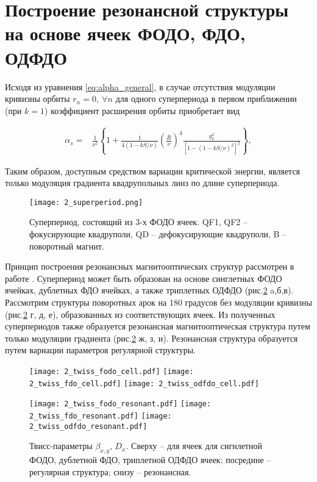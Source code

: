 	\section{Построение резонансной структуры на основе ячеек ФОДО, ФДО, ОДФДО}\label{sec:transition_variation/methods/FODO_FDO}

Исходя из уравнения \ref{eq:alpha_general}, в случае отсутствия модуляции кривизны орбиты $r_n=0, \ \forall n$ для одного суперпериода в первом приближении (при $k=1$) коэффициент расширения орбиты приобретает вид
	
\begin{equation}
\begin{aligned}
\alpha_s= & \frac{1}{\nu^2}\left\{1+\frac{1}{4(1-k S / \nu)}\left(\frac{\bar{R}}{\nu}\right)^4 \frac{g_k^2}{\left[1-(1-k S / \nu)^2\right]^2}\right\},
\end{aligned}
\label{eq:alpha_gradient}
\end{equation}

\noindent Таким образом, доступным средством вариации критической энергии, является только модуляция градиента квадрупольных линз по длине суперпериода.

\begin{figure} [h!]
   \texttt{[image: 2\_superperiod.png]}
   \caption{Суперпериод, состоящий из 3-х ФОДО ячеек. QF1, QF2 – фокусирующие квадруполи, QD –  дефокусирующие квадруполи, B – поворотный магнит.}
   \label{fig:superperiod_3FODO}
\end{figure}
	
\par Принцип построения резонансных магнитооптических структур рассмотрен в работе \cite{senichev:construction}.
Суперпериод может быть образован на основе синглетных ФОДО ячейках, дублетных ФДО ячейках, а также триплетных ОДФДО (рис.\ref{fig:fodo_fdo_odfdo} a,б,в). Рассмотрим структуры поворотных арок на 180 градусов без модуляции кривизны (рис.\ref{fig:fodo_fdo_odfdo} г, д, е), образованных из соответствующих ячеек. Из полученных суперпериодов также образуется резонансная магнитооптическая структура путем только модуляции градиента (рис.\ref{fig:fodo_fdo_odfdo} ж, з, и). Резонансная структура образуется путем вариации параметров регулярной структуры.

\begin{figure} [h!]

   \texttt{[image: 2\_twiss\_fodo\_cell.pdf]}
   \texttt{[image: 2\_twiss\_fdo\_cell.pdf]}
   \texttt{[image: 2\_twiss\_odfdo\_cell.pdf]}

   \texttt{[image: 2\_twiss\_fodo\_resonant.pdf]}
   \texttt{[image: 2\_twiss\_fdo\_resonant.pdf]}
   \texttt{[image: 2\_twiss\_odfdo\_resonant.pdf]}

   \caption{Твисс-параметры $\beta_{x,y}$, $D_{x}$. Сверху -- для ячеек для сигнлетной ФОДО, дублетной ФДО, триплетной ОДФДО ячеек; посредине -- регулярная структура; снизу -- резонансная.}
   \label{fig:fodo_fdo_odfdo}
\end{figure}

